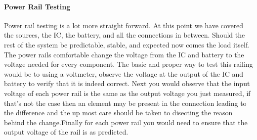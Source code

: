 \paragraph{Power Rail Testing}
Power rail testing is a lot more straight forward. At this point we have covered the sources, the IC, the battery, and all the connections in between. Should the rest of the system be predictable, stable, and expected now comes the load itself. The power rails comfortable change the voltage from the IC and battery to the voltage needed for every component. The basic and proper way to test this railing would be to using a voltmeter, observe the voltage at the output of the IC and battery to verify that it is indeed correct. Next you would observe that the input voltage of each power rail is the same as the output voltage you just measured, if that's not the case then an element may be present in the connection leading to the difference and the up most care should be taken to disecting the reason behind the change.\. Finally for each power rail you would need to ensure that the output voltage of the rail is as predicted.